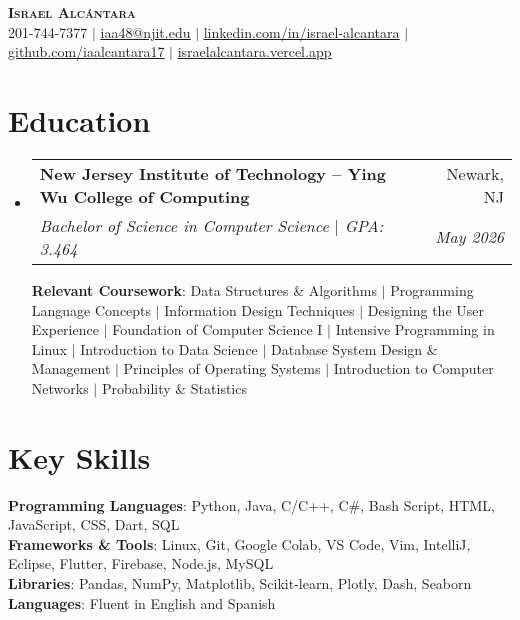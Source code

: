 \documentclass[letterpaper,11pt]{article}
\makeatletter
\newcommand{\resumeSubheading}[4]{
  \vspace{-2pt}\item
    \begin{tabular*}{0.97\textwidth}[t]{l@{\extracolsep{\fill}}r}
      \textbf{#1} & #2 \\
      \textit{\small#3} & \textit{\small #4} \\
    \end{tabular*}\vspace{-7pt}
}
\newcommand{\resumeSubHeadingListStart}{\begin{itemize}[leftmargin=0.15in, label={}]}
\newcommand{\resumeSubHeadingListEnd}{\end{itemize}}
\makeatother
\begin{document}
\begin{center}
    \textbf{\Huge \scshape Israel Alcántara} \\ \vspace{1pt}
    \small 201-744-7377 $|$ 
    \href{mailto:iaa48@njit.edu}{\underline{iaa48@njit.edu}} $|$ 
    \href{https://linkedin.com/in/israel-alcantara}{\underline{linkedin.com/in/israel-alcantara}} $|$
    \href{https://github.com/iaalcantara17}{\underline{github.com/iaalcantara17}} $|$
    \href{https://israelalcantara.vercel.app/}{\underline{israelalcantara.vercel.app}}
\end{center}

\section{Education}
  \resumeSubHeadingListStart
    \resumeSubheading
      {New Jersey Institute of Technology – Ying Wu College of Computing}{Newark, NJ}
      {Bachelor of Science in Computer Science $|$ GPA: 3.464}{May 2026}
      \begin{flushleft}
        \small \textbf{Relevant Coursework}: Data Structures \& Algorithms $|$ Programming Language Concepts $|$ Information Design Techniques $|$ Designing the User Experience $|$ Foundation of Computer Science I $|$ Intensive Programming in Linux $|$ Introduction to Data Science $|$ Database System Design \& Management $|$ Principles of Operating Systems $|$ Introduction to Computer Networks $|$ Probability \& Statistics
      \end{flushleft}
  \resumeSubHeadingListEnd

\section{Key Skills}
\begin{itemize}[leftmargin=0.15in, label={}]
    \small{\item{
      \textbf{Programming Languages}{: Python, Java, C/C++, C\#, Bash Script, HTML, JavaScript, CSS, Dart, SQL} \\
      \textbf{Frameworks \& Tools}{: Linux, Git, Google Colab, VS Code, Vim, IntelliJ, Eclipse, Flutter, Firebase, Node.js, MySQL} \\
      \textbf{Libraries}{: Pandas, NumPy, Matplotlib, Scikit-learn, Plotly, Dash, Seaborn} \\
      \textbf{Languages}{: Fluent in English and Spanish} \\
    }}
\end{itemize}
\end{document}
